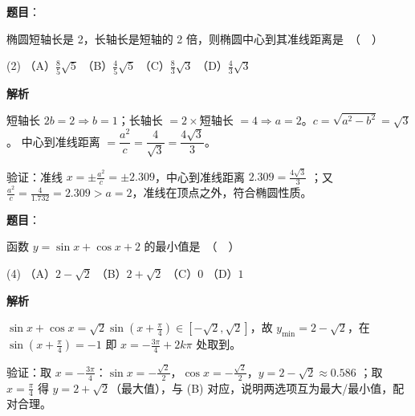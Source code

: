 \begin{answer}

\textbf{题目}：

椭圆短轴长是 2，长轴长是短轴的 2 倍，则椭圆中心到其准线距离是　（　）

\begin{gkopts}(2)
\task （A）$\frac{8}{5}\sqrt{5}$
\task （B）$\frac{4}{5}\sqrt{5}$
\task （C）$\frac{8}{3}\sqrt{3}$
\task （D）$\frac{4}{3}\sqrt{3}$
\end{gkopts}

\textbf{解析}

短轴长 $2b=2\Rightarrow b=1$；长轴长 $=2\times$短轴长 $=4\Rightarrow a=2$。$c=\sqrt{a^2-b^2}=\sqrt3$。
中心到准线距离 $=\dfrac{a^2}{c}=\dfrac{4}{\sqrt3}=\dfrac{4\sqrt3}{3}$。

验证：准线 $x=\pm\frac{a^2}{c}=\pm2.309$，中心到准线距离 $2.309=\frac{4\sqrt3}{3}$ ；又 $\frac{a^2}{c}=\frac{4}{1.732}=2.309>a=2$，准线在顶点之外，符合椭圆性质。


\end{answer}
\begin{answer}

\textbf{题目}：

函数 $y = \sin x + \cos x + 2$ 的最小值是　（　）

\begin{gkopts}(4)
\task （A）$2 - \sqrt{2}$
\task （B）$2 + \sqrt{2}$
\task （C）$0$
\task （D）$1$
\end{gkopts}

\textbf{解析}

$\sin x+\cos x=\sqrt2\sin\!\left(x+\frac\pi4\right)\in[-\sqrt2,\sqrt2]$，故 $y_{\min}=2-\sqrt2$，在 $\sin(x+\frac\pi4)=-1$ 即 $x=-\frac{3\pi}{4}+2k\pi$ 处取到。

验证：取 $x=-\frac{3\pi}{4}$：$\sin x=-\frac{\sqrt2}{2}$，$\cos x=-\frac{\sqrt2}{2}$，$y=2-\sqrt2\approx0.586$ ；取 $x=\frac{\pi}{4}$ 得 $y=2+\sqrt2$（最大值），与 (B) 对应，说明两选项互为最大/最小值，配对合理。


\end{answer}
